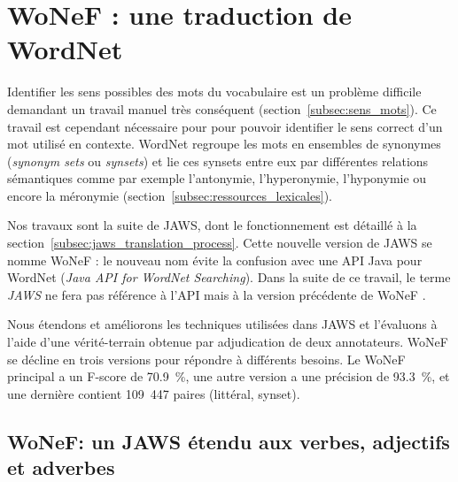 

\chapter{WoNeF : une traduction de WordNet}
\label{ch:wonef} 

Identifier les sens possibles des mots du vocabulaire est un problème difficile
demandant un travail manuel très conséquent (section~\ref{subsec:sens_mots}).
Ce travail est cependant nécessaire pour pour pouvoir identifier le sens
correct d'un mot utilisé en contexte. WordNet \citep{fellbaum1998wordnet}
regroupe les mots en ensembles de synonymes (\emph{synonym sets} ou
\emph{synsets}) et lie ces synsets entre eux par différentes relations
sémantiques comme par exemple l'antonymie, l'hyperonymie, l'hyponymie ou encore
la méronymie (section~\ref{subsec:ressources_lexicales}).

Nos travaux \citep{pradet2013wonef,pradet2014wonef} sont la suite de JAWS, dont
le fonctionnement est détaillé à la
section~\ref{subsec:jaws_translation_process}. Cette nouvelle version de JAWS
se nomme WoNeF : le nouveau nom évite la confusion avec une API Java pour
WordNet (\emph{Java API for WordNet Searching}). Dans la suite de ce travail,
le terme \emph{JAWS} ne fera pas référence à l'API mais à la version précédente
de WoNeF \citep{mouton2010jaws,mouton2010phd}.

Nous étendons et améliorons les techniques utilisées dans JAWS et l'évaluons à
l'aide d'une vérité-terrain obtenue par adjudication de deux annotateurs. WoNeF
se décline en trois versions pour répondre à différents besoins. Le WoNeF
principal a un F-score de 70.9~\%, une autre version a une précision de
93.3~\%, et une dernière contient 109~447 paires (littéral, synset).

\section{WoNeF: un JAWS étendu aux verbes, adjectifs et adverbes}
\label{sec:improving_jaws}

